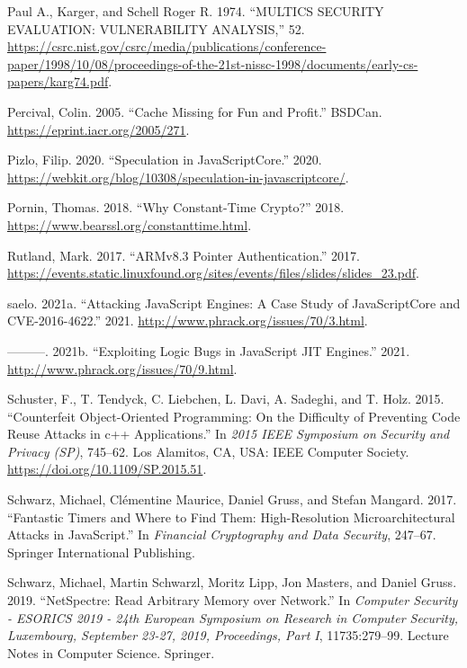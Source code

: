 \documentclass[
  a4paper,
]{report}
\newlength{\cslhangindent}
\newlength{\cslentryspacingunit} %
\newenvironment{CSLReferences}[2] %
 {%
  \setlength{\parindent}{0pt}
  \ifodd #1
  \let\oldpar\par
  \def\par{\hangindent=\cslhangindent\oldpar}
  \fi
  \setlength{\parskip}{#2\cslentryspacingunit}
 }%
 {}
\begin{document}
\begin{CSLReferences}{1}{0}
\leavevmode{}%
Paul A., Karger, and Schell Roger R. 1974. {``MULTICS SECURITY
EVALUATION: VULNERABILITY ANALYSIS,''} 52.
\url{https://csrc.nist.gov/csrc/media/publications/conference-paper/1998/10/08/proceedings-of-the-21st-nissc-1998/documents/early-cs-papers/karg74.pdf}.

\leavevmode{}%
Percival, Colin. 2005. {``Cache Missing for Fun and Profit.''} BSDCan.
\url{https://eprint.iacr.org/2005/271}.

\leavevmode{}%
Pizlo, Filip. 2020. {``Speculation in JavaScriptCore.''} 2020.
\url{https://webkit.org/blog/10308/speculation-in-javascriptcore/}.

\leavevmode{}%
Pornin, Thomas. 2018. {``Why Constant-Time Crypto?''} 2018.
\url{https://www.bearssl.org/constanttime.html}.

\leavevmode{}%
Rutland, Mark. 2017. {``ARMv8.3 Pointer Authentication.''} 2017.
\url{https://events.static.linuxfound.org/sites/events/files/slides/slides_23.pdf}.

\leavevmode{}%
saelo. 2021a. {``Attacking JavaScript Engines: A Case Study of
JavaScriptCore and CVE-2016-4622.''} 2021.
\url{http://www.phrack.org/issues/70/3.html}.

\leavevmode{}%
---------. 2021b. {``Exploiting Logic Bugs in JavaScript JIT Engines.''}
2021. \url{http://www.phrack.org/issues/70/9.html}.

\leavevmode{}%
Schuster, F., T. Tendyck, C. Liebchen, L. Davi, A. Sadeghi, and T. Holz.
2015. {``Counterfeit Object-Oriented Programming: On the Difficulty of
Preventing Code Reuse Attacks in c++ Applications.''} In \emph{2015 IEEE
Symposium on Security and Privacy (SP)}, 745--62. Los Alamitos, CA, USA:
IEEE Computer Society. \url{https://doi.org/10.1109/SP.2015.51}.

\leavevmode{}%
Schwarz, Michael, Clémentine Maurice, Daniel Gruss, and Stefan Mangard.
2017. {``Fantastic Timers and Where to Find Them: High-Resolution
Microarchitectural Attacks in {JavaScript}.''} In \emph{Financial
Cryptography and Data Security}, 247--67. Springer International
Publishing.

\leavevmode{}%
Schwarz, Michael, Martin Schwarzl, Moritz Lipp, Jon Masters, and Daniel
Gruss. 2019. {``NetSpectre: Read Arbitrary Memory over Network.''} In
\emph{Computer Security - {ESORICS} 2019 - 24th European Symposium on
Research in Computer Security, Luxembourg, September 23-27, 2019,
Proceedings, Part {I}}, 11735:279--99. Lecture Notes in Computer
Science. Springer.


\end{CSLReferences}
\end{document}

